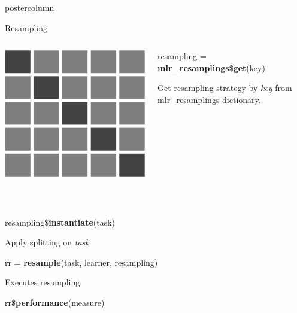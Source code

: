 \documentclass{beamer}
\begin{document}
\begin{frame}[fragile]{}
\begin{columns}
\begin{column}{.245\textwidth}
\begin{beamercolorbox}[center]{postercolumn}
\begin{minipage}{.98\textwidth}
{\begin{myblock}{Resampling}
\begin{minipage}{\textwidth}
\begin{columns}[T]
\begin{column}{0.2\textwidth}
									    \includegraphics[width=\textwidth]{img/cross_validation.png}
								    \end{column}
								    \begin{column}{0.8\textwidth}
										  \begin{codebox}
										    resampling = \textbf{mlr\_resamplings}\$\textbf{get}(key)
										  \end{codebox}
										  Get resampling strategy by \textit{key} from mlr\_resamplings dictionary.
								    \end{column}
							     \end{columns}
					      	\end{minipage}
						      \\[\baselineskip]
						      \begin{codebox}
							      resampling\$\textbf{instantiate}(task)
						      \end{codebox}
						      Apply splitting on \textit{task}.
						      \\
					      	\begin{codebox}
							      rr = \textbf{resample}(task, learner, resampling)
						      \end{codebox}
						      Executes resampling.
						      \\
						      \begin{codebox}
							      rr\$\textbf{performance}(measure)
						      \end{codebox}

\end{myblock}}
\end{minipage}
\end{beamercolorbox}
\end{column}
\end{columns}
\end{frame}
\end{document}
